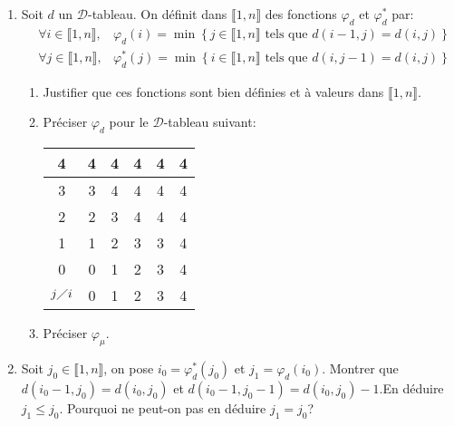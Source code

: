 \begin{enumerate}
\item Soit $d$ un $\mathcal{D}$-tableau. On définit dans $\llbracket 1,n \rrbracket$ des fonctions $\varphi_d$ et $\varphi^*_d$ par:
\begin{align*}
  &\forall i \in\llbracket 1,n \rrbracket, &\varphi_d(i) =
  \min\left\lbrace j\in \llbracket 1,n\rrbracket \text{ tels que } d(i-1,j) = d(i,j)\right\rbrace \\ 
  &\forall j \in\llbracket 1,n \rrbracket, &\varphi^*_d(j) =
  \min\left\lbrace i\in \llbracket 1,n\rrbracket \text{ tels que } d(i,j-1) = d(i,j)\right\rbrace 
\end{align*}
\begin{enumerate}
  \item Justifier que ces fonctions sont bien définies et à valeurs dans $\llbracket 1, n \rrbracket$.
  \item Préciser $\varphi_d$ pour le $\mathcal{D}$-tableau suivant:
\begin{center}
\renewcommand {\arraystretch} {1.2}
\begin{tabular}{c|c|c|c|c|c|}
4            & 4 & 4 & 4 & 4 & 4 \\ \hline
3            & 3 & 4 & 4 & 4 & 4 \\ \hline
2            & 2 & 3 & 4 & 4 & 4 \\ \hline
1            & 1 & 2 & 3 & 3 & 4 \\ \hline
0            & 0 & 1 & 2 & 3 & 4 \\ \hline
$j\diagup i$ & 0   & 1   & 2   & 3   & 4
\end{tabular}
\end{center}

  \item Préciser $\varphi_{\mu}$. %
\end{enumerate}

  \item Soit $j_0\in \llbracket 1,n \rrbracket$, on pose $i_0= \varphi^*_d(j_0)$ et $j_1 = \varphi_d(i_0)$.\newline 
Montrer que $d(i_0-1,j_0) = d(i_0,j_0)$ et $d(i_0-1,j_0 -1) = d(i_0,j_0) -1$.\newline En déduire $j_1\leq j_0$. Pourquoi ne peut-on pas en déduire $j_1=j_0$?


\end{enumerate}


